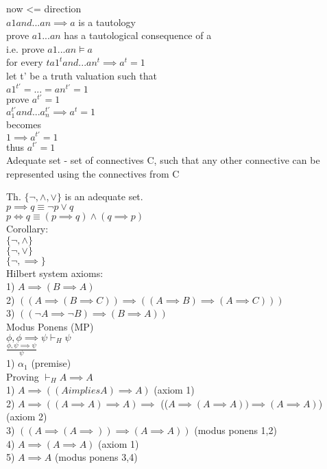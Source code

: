 \documentclass[12pt,oneside,fleqn]{article}
\theoremstyle{definition}
\begin{document}
now <= direction \\
$a1 and ... an \implies a$ is a tautology \\
prove $a1...an$ has a tautological consequence of a \\
i.e. prove $a1...an \vDash a$ \\

for every $t a1^t and ...an^t \implies a^t = 1$ \\
let t' be a truth valuation such that \\
$a1^{t'} = ... = an^{t'} = 1$ \\
prove $a^{t'} = 1$ \\
$a_1^{t'} and ... a_n^{t'} \implies a^t = 1$ \\
becomes \\
$1 \implies a^{t'} = 1$ \\
thus $a^{t'} = 1$ \\

Adequate set - set of connectives C, such that any other connective can be represented using the connectives from C

Th. $\{ \neg, \land, \lor \}$ is an adequate set. \\
$p \implies q \equiv \neg p \lor q$ \\
$p \iff q \equiv (p \implies q) \land (q \implies p)$ \\
Corollary: \\
$\{ \neg, \land \}$ \\
$\{ \neg, \lor \}$ \\
$\{ \neg, \implies \}$ \\

Hilbert system axioms: \\
1) $A \implies (B \implies A)$ \\
2) $((A \implies (B \implies C)) \implies ((A \implies B) \implies (A \implies C)))$ \\
3) $((\neg A \implies \neg B) \implies (B \implies A))$ \\

Modus Ponens (MP) \\
${\phi, \phi \implies \psi} \vdash_H \psi$ \\
$\frac{\phi, \psi \implies \psi}{\psi}$ \\
1) $\alpha_1$ (premise) \\

Proving $\vdash_H A \implies A$ \\
1) $A \implies ((A implies A) \implies A)$ (axiom 1) \\
2) $A \implies (( A \implies A) \implies A) \implies$ (($A \implies (A \implies A)) \implies (A \implies A)$) (axiom 2) \\
3) $((A \implies (A \implies)) \implies (A \implies A))$ (modus ponens 1,2) \\
4) $A \implies (A \implies A)$ (axiom 1) \\
5) $A \implies A$ (modus ponens 3,4) \\
\end{document}
